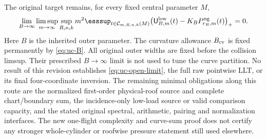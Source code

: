 The original target remains, for every fixed central parameter $M$,
\begin{equation}\label{eq:uc-open-limit}
 \lim_{B\to\infty}\limsup_{m\to\infty}\sup_{R,n,k}m^2
 \esssup_{t\in\mathcal C_{m,R,n,k}(M)}
 \bigl(\mathsf U^{\rm low}_{B,m}(t)
                   -K_B P^{\rm ng}_{r_B,m}(t)\bigr)_+=0.
\end{equation}
Here $B$ is the inherited outer parameter. The curvature allowance $B_{\rm cv}$
is fixed permanently by \eqref{eq:uc-B}. All original
outer widths are fixed before the collision limsup. Their prescribed
$B\to\infty$ limit is not used to tune the curve partition.
No result of this revision establishes \eqref{eq:uc-open-limit}, the full
raw pointwise LLT, or its final four-coordinate inversion. The remaining
minimal obligations along this route are the normalized first-order
physical-roof source and complete chart/boundary sum, the incidence-only
low-load source or valid comparison capacity, and the stated original
spectral, arithmetic, pairing and normalization interfaces. The new
one-flight complexity and curve-sum proof does not certify any stronger
whole-cylinder or roofwise pressure statement still used elsewhere.

